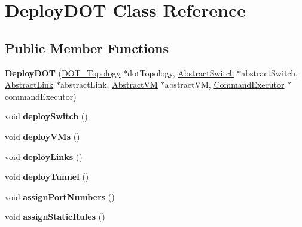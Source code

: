 \hypertarget{classDeployDOT}{\section{\-Deploy\-D\-O\-T \-Class \-Reference}
\label{classDeployDOT}
}
\subsection*{\-Public \-Member \-Functions}
\begin{DoxyCompactItemize}
\item 
\hypertarget{classDeployDOT_ab91deec97001c64fd93a01d814174455}{{\bfseries \-Deploy\-D\-O\-T} (\hyperlink{classDOT__Topology}{\-D\-O\-T\-\_\-\-Topology} $\ast$dot\-Topology, \hyperlink{classAbstractSwitch}{\-Abstract\-Switch} $\ast$abstract\-Switch, \hyperlink{classAbstractLink}{\-Abstract\-Link} $\ast$abstract\-Link, \hyperlink{classAbstractVM}{\-Abstract\-V\-M} $\ast$abstract\-V\-M, \hyperlink{classCommandExecutor}{\-Command\-Executor} $\ast$command\-Executor)}\label{classDeployDOT_ab91deec97001c64fd93a01d814174455}

\item 
\hypertarget{classDeployDOT_a5bc6c4ceeebf14d8ebd7dddd23976a09}{void {\bfseries deploy\-Switch} ()}\label{classDeployDOT_a5bc6c4ceeebf14d8ebd7dddd23976a09}

\item 
\hypertarget{classDeployDOT_a0ab3616f50ef45f4a846517e1b06cbe1}{void {\bfseries deploy\-V\-Ms} ()}\label{classDeployDOT_a0ab3616f50ef45f4a846517e1b06cbe1}

\item 
\hypertarget{classDeployDOT_aaf5cd37f304670d159988e50b4cf71d6}{void {\bfseries deploy\-Links} ()}\label{classDeployDOT_aaf5cd37f304670d159988e50b4cf71d6}

\item 
\hypertarget{classDeployDOT_a3206c097784fbc9522322b565563f8c1}{void {\bfseries deploy\-Tunnel} ()}\label{classDeployDOT_a3206c097784fbc9522322b565563f8c1}

\item 
\hypertarget{classDeployDOT_a60bfbc2fa2bed521023d623c9c8788db}{void {\bfseries assign\-Port\-Numbers} ()}\label{classDeployDOT_a60bfbc2fa2bed521023d623c9c8788db}

\item 
\hypertarget{classDeployDOT_aa3c806879e86a2a4731d616aa4453fdb}{void {\bfseries assign\-Static\-Rules} ()}\label{classDeployDOT_aa3c806879e86a2a4731d616aa4453fdb}


\end{DoxyCompactItemize}
